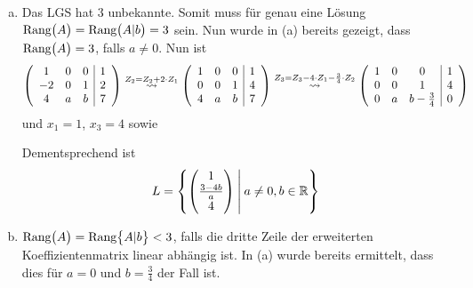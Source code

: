 \documentclass{scrreprt}
\begin{document}
\begin{enumerate}[(a)]
\item Das LGS hat 3 unbekannte.
  Somit muss für genau eine Lösung
  $\text{Rang}\qty\big(A) = \text{Rang}\qty\big(A|b) = 3$ sein.
  Nun wurde in (a) bereits gezeigt, dass $\text{Rang}\qty\big(A) = 3$, falls
  $a \ne 0$.
  Nun ist
  \[
    \qty(\begin{array}{ccc|c}
      1  & 0 & 0 & 1 \\
      -2 & 0 & 1 & 2 \\
      4  & a & b & 7 \\
    \end{array})
    \overset{Z_2 = Z_2 + 2 \cdot Z_1}\leadsto
    \qty(\begin{array}{ccc|c}
      1 & 0 & 0 & 1 \\
      0 & 0 & 1 & 4 \\
      4 & a & b & 7 \\
    \end{array})
    \overset{Z_3 = Z_3 - 4 \cdot Z_1 - \frac{3}{4} \cdot Z_2}\leadsto
    \qty(\begin{array}{ccc|c}
      1 & 0 & 0               & 1 \\
      0 & 0 & 1               & 4 \\
      0 & a & b - \frac{3}{4} & 0 \\
    \end{array})
  \]
  und $x_1 = 1$, $x_3 = 4$ sowie
  Dementsprechend ist
  \[
    L = \qty{\begin{pmatrix}
      1 \\
      \frac{3 - 4b}{a} \\
      4 \\
    \end{pmatrix} \:\middle|\: a \ne 0, b \in \mathbb{R}}
  \]

\item $\text{Rang}\qty\big(A) = \text{Rang}\qty\big{A|b} < 3$, falls
  die dritte Zeile der erweiterten Koeffizientenmatrix linear abhängig ist.
  In (a) wurde bereits ermittelt, dass dies für $a = 0$ und $b = \frac{3}{4}$
  der Fall ist.


\end{enumerate}
\end{document}
